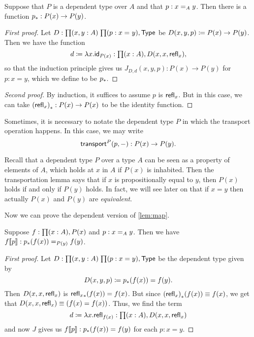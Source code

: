 \begin{lem}[Transport]\label{lem:transport}
  Suppose that $P$ is a dependent type over $A$ and that $p:\id[A]xy$.
  Then there is a function $\transf{p}:P(x)\to P(y)$.
\end{lem}

\begin{proof}[First proof]
  Let $D:\prd{x,y:A}{p:\id{x}{y}} \type$ be $D(x,y,p)\defeq P(x)\to P(y)$.
  Then we have the function
  \begin{equation*}
    d\defeq\lambda x.\idfunc[P(x)]:\prd{x:A} D(x,x,\refl{x}),
  \end{equation*}
  so that the induction principle gives us $J_{D,d}(x,y,p):P(x)\to P(y)$ for $p:x= y$, which we define to be $\transf p$.
\end{proof}

\begin{proof}[Second proof]
  By induction, it suffices to assume $p$ is $\refl x$.
  But in this case, we can take $\transf{(\refl x)}:P(x)\to P(x)$ to be the identity function.
\end{proof}

Sometimes, it is necessary to notate the dependent type $P$ in which the transport operation happens.
In this case, we may write
\[\transfib P p - : P(x) \to P(y).\]

Recall that a dependent type $P$ over a type $A$ can be seen as a property of elements of $A$, which holds at $x$ in $A$ if $P(x)$ is inhabited.
Then the transportation lemma says that if $x$ is propositionally equal to $y$, then $P(x)$ holds if and only if $P(y)$ holds.
In fact, we will see later on that if $x=y$ then actually $P(x)$ and $P(y)$ are \emph{equivalent}.

Now we can prove the dependent version of \autoref{lem:map}.

\begin{lem}\label{lem:mapdep}
  Suppose $f:\prd{x: A} P(x)$ and $p:\id[A]xy$.
  Then we have $\mapdep fp:\id[P(y)]{\trans p{f(x)}}{f(y)}$.
\end{lem}

\begin{proof}[First proof]
  Let $D:\prd{x,y:A}{p:x=y} \type$ be the dependent type given by
  \begin{equation*}
    D(x,y,p)\defeq \trans p {f(x)}= f(y).
  \end{equation*}
  Then $D(x,x,\refl{x})$ is $\trans{\refl{x}}{f(x)}= f(x)$.
  But since $\trans{(\refl{x})}{f(x)}\jdeq f(x)$, we get that $D(x,x,\refl{x})\jdeq (f(x)= f(x))$.
  Thus, we find the term
  \begin{equation*}
    d\defeq\lambda x.\refl{f(x)}:\prd{x:A} D(x,x,\refl{x})
  \end{equation*}
  and now $J$ gives us $\mapdep fp:\trans p{f(x)}= f(y)$ for each $p:x= y$.
\end{proof}

